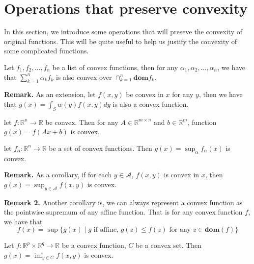 \section{Operations that preserve convexity}
In this section, we introduce some operations that will preseve the convexity of original functions. This will be quite useful to help us justify the convexity of some complicated functions.
\begin{proposition}
Let $f_1,f_2,\ldots, f_n$ be a list of convex functions, then for any $\alpha_1,\alpha_2,\ldots, \alpha_n$, we have that $\sum_{k=1}^n \alpha_k f_k$ is also convex over $\cap_{k=1}^n \textbf{dom} f_k$.
\end{proposition}
\textbf{Remark.} As an extension, let $f(x, y)$ be convex in $x$ for any $y$, then we have that $g(x)=\int_S w(y) f(x,y) dy$ is also a convex function.

\begin{proposition}
let $f:\mathbb R^n\rightarrow \mathbb R$ be convex. Then for any $A\in \mathbb R^{m\times n}$ and $b\in \mathbb R^m$, function $g(x)=f(Ax+b)$ is convex.
\end{proposition}

\begin{proposition}
let $f_\alpha:\mathbb R^n\rightarrow \mathbb R$ be a set of convex functions. Then $g(x)=\sup_\alpha f_\alpha(x)$ is convex.
\end{proposition}
\textbf{Remark.} As a corollary, if for each $y\in \mathcal A$, $f(x,y)$ is convex in $x$, then $g(x)=\sup_{y\in \mathcal A} f(x,y)$ is convex.

\textbf{Remark 2.} Another corollary is, we can always represent a convex function as the pointwise supremum of any affine function. That is for any convex function $f$, we have that
\begin{equation}
f(x)=\sup \{g(x)\mid g \text{ if affine, $g(z)\leq f(z)$ for any $z\in \textbf{dom}(f)$}\}
\end{equation}

\begin{proposition}[Minimization]
Let $f: \mathbb R^p \times \mathbb R^q \rightarrow \mathbb R$ be a convex function, $C$ be a convex set. Then $g(x)=\inf_{y\in C} f(x,y)$ is convex.
\end{proposition}

